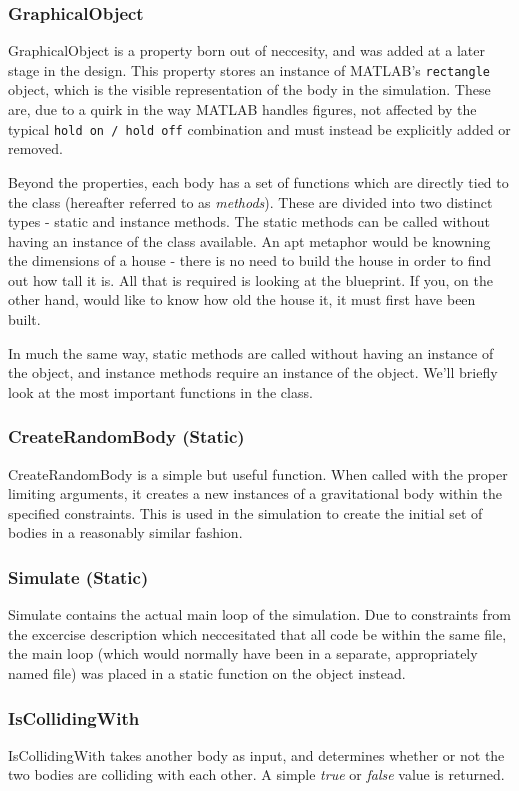 \documentclass[11pt]{article}
\begin{document}
\subsubsection{GraphicalObject}
GraphicalObject is a property born out of neccesity, and was added at a later stage in the design. This property stores an instance of MATLAB's \verb|rectangle| object, which is the visible representation of the body in the simulation. These are, due to a quirk in the way MATLAB handles figures, not affected by the typical \verb|hold on / hold off| combination and must instead be explicitly added or removed.

Beyond the properties, each body has a set of functions which are directly tied to the class (hereafter referred to as \emph{methods}). These are divided into two distinct types - static and instance methods. The static methods can be called without having an instance of the class available. An apt metaphor would be knowning the dimensions of a house - there is no need to build the house in order to find out how tall it is. All that is required is looking at the blueprint. If you, on the other hand, would like to know how old the house it, it must first have been built.

In much the same way, static methods are called without having an instance of the object, and instance methods require an instance of the object. We'll briefly look at the most important functions in the class.

\subsubsection{CreateRandomBody (Static)}
CreateRandomBody is a simple but useful function. When called with the proper limiting arguments, it creates a new instances of a gravitational body within the specified constraints. This is used in the simulation to create the initial set of bodies in a reasonably similar fashion.
\subsubsection{Simulate (Static)}
Simulate contains the actual main loop of the simulation. Due to constraints from the excercise description which neccesitated that all code be within the same file, the main loop (which would normally have been in a separate, appropriately named file) was placed in a static function on the object instead.
\subsubsection{IsCollidingWith}
IsCollidingWith takes another body as input, and determines whether or not the two bodies are colliding with each other. A simple \emph{true} or \emph{false} value is returned.
\end{document}
